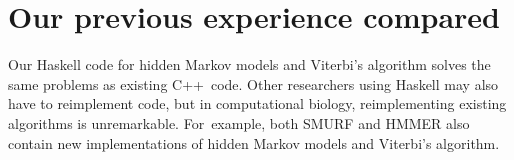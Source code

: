\documentclass[]{jfp1}
\newcommand\seclabel[1]{\label{sec:#1}}
\begin{document}


 
 
\section{Our previous experience compared}
\seclabel{comparo}

Our Haskell code for hidden Markov models and Viterbi's algorithm
solves the same problems as existing C++~code.
Other researchers using Haskell may also have to reimplement code,
but
in computational biology, reimplementing existing algorithms is unremarkable.
For~example, both SMURF and HMMER also contain new implementations of
hidden Markov models and Viterbi's algorithm.
\end{document}
